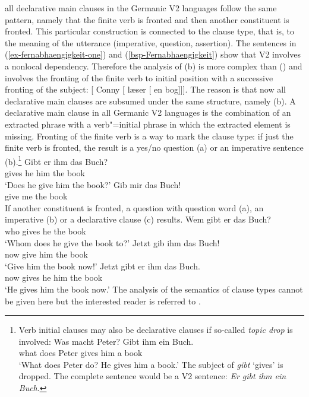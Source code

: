 all declarative main clauses in the Germanic V2 languages follow the same pattern, namely that the
finite verb is fronted and then another constituent is fronted. This particular construction is
connected to the clause type, that is, to the meaning of the utterance (imperative, question,
assertion). The sentences in (\ref{ex-fernabhaengigkeit-one}) and (\ref{bsp-Fernabhaengigkeit}) show
that V2 involves a nonlocal dependency. Therefore the analysis
of (b) is more complex than () and involves the fronting of the finite verb to initial
position with a successive fronting of the subject:
\ea
{}[ Conny [ læser [ en bog]]].
\z
The reason is that now all declarative main clauses are subsumed under the same structure, namely
(b). A declarative main clause in all Germanic V2 languages is the combination of an extracted
phrase with a verb"=initial phrase in which the extracted element is missing. Fronting of the finite
verb is a way to mark the clause type: if just the finite verb is fronted, the result is a yes/no question (a)
or an imperative sentence (b).\footnote{
  Verb initial clauses may also be declarative clauses if so-called \emph{topic drop} \citep{Fries88b} is involved:
  \ea
  \gll Was macht Peter? Gibt ihm ein Buch.\\
       what does Peter  gives him a book\\\german
  \glt `What does Peter do? He gives him a book.'
  \z
  The subject of \emph{gibt} `gives' is dropped. The complete sentence would be a V2 sentence:
  \emph{Er gibt ihm ein Buch}.
}
\eal
\ex 
\gll Gibt er ihm das Buch?\\
     gives he him the book\\\german
\glt `Does he give him the book?'
\ex 
\gll Gib mir das Buch!\\
     give me the book\\
\zl
If another constituent is fronted, a question with question word (a), an imperative
(b) or a declarative clause (c) results.
\eal
\ex 
\gll Wem gibt er das Buch?\\
     who gives he the book\\\german
\glt `Whom does he give the book to?'
\ex 
\gll Jetzt gib ihm das Buch!\\
     now give him the book\\
\glt `Give him the book now!'
\ex 
\gll Jetzt gibt er ihm das Buch.\\
     now gives he him the book\\
\glt `He gives him the book now.'
\zl
The analysis of the semantics of clause types cannot be given here but the interested reader is
referred to .


